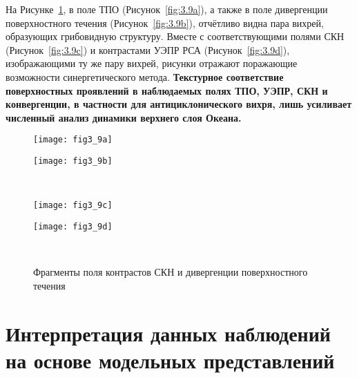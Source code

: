 На Рисунке~\ref{fig:3.9}, в поле ТПО (Рисунок~\ref{fig:3.9a}), а также в поле дивергенции поверхностного течения (Рисунок~\ref{fig:3.9b}), отчётливо видна пара вихрей, образующих грибовидную структуру. Вместе с соответствующими полями СКН (Рисунок~\ref{fig:3.9c}) и контрастами УЭПР РСА (Рисунок~\ref{fig:3.9d}), изображающими ту же пару вихрей, рисунки отражают поражающие возможности синергетического метода. \textbf{Текстурное соответствие поверхностных проявлений в наблюдаемых полях ТПО, УЭПР, СКН и конвергенции, в частности для антициклонического вихря, лишь усиливает численный анализ динамики верхнего слоя Океана.}



\begin{figure}[H]
   	\centering
	\begin{minipage}{.47\textwidth}
	    \subcaptionbox{\label{fig:3.9a}}
		{\texttt{[image: fig3\_9a]}}
	\end{minipage}
	\hfill
	\begin{minipage}{.47\textwidth}
	    \subcaptionbox{\label{fig:3.9b}}
		{\texttt{[image: fig3\_9b]}}
	\end{minipage}
	\\
	\begin{minipage}{.47\textwidth}
	    \subcaptionbox{\label{fig:3.9c}}
		{\texttt{[image: fig3\_9c]}}
	\end{minipage}
	\hfill
	\begin{minipage}{.47\textwidth}
	    \subcaptionbox{\label{fig:3.9d}}
		{\texttt{[image: fig3\_9d]}}
	\end{minipage}
    \\
    \caption{Фрагменты поля контрастов СКН и дивергенции поверхностного течения}
    \label{fig:3.9}
\end{figure}



\section{Интерпретация данных наблюдений на основе модельных представлений} \label{sec:3.3}


